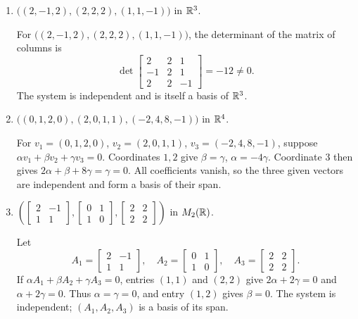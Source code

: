 \begin{enumerate}[label=\alph*)]
\item $\bigl((2,-1,2),(2,2,2),(1,1,-1)\bigr)$ in $\mathbb R^3$.

\begin{answer}
For $\bigl((2,-1,2),(2,2,2),(1,1,-1)\bigr)$, the determinant of the
matrix of columns is
\[
 \det\begin{bmatrix}2&2&1\\-1&2&1\\2&2&-1\end{bmatrix}=-12\ne0.
\]
The system is independent and is itself a basis of $\mathbb R^3$.
\end{answer}

\item $\bigl((0,1,2,0),(2,0,1,1),(-2,4,8,-1)\bigr)$ in $\mathbb R^4$.

\begin{answer}
For $v_1=(0,1,2,0)$, $v_2=(2,0,1,1)$, $v_3=(-2,4,8,-1)$,
suppose $\alpha v_1+\beta v_2+\gamma v_3=0$.
Coordinates $1,2$ give $\beta=\gamma$, $\alpha=-4\gamma$.
Coordinate $3$ then gives $2\alpha+\beta+8\gamma=\gamma=0$.
All coefficients vanish, so the three given vectors are independent
and form a basis of their span.
\end{answer}

\item $\left(\begin{bmatrix}2&-1\\1&1\end{bmatrix},\begin{bmatrix}0&1\\1&0\end{bmatrix},\begin{bmatrix}2&2\\2&2\end{bmatrix}\right)$ in $M_2(\mathbb R)$.

\begin{answer}
Let
\[
 A_1=\begin{bmatrix}2&-1\\1&1\end{bmatrix},\quad
 A_2=\begin{bmatrix}0&1\\1&0\end{bmatrix},\quad
 A_3=\begin{bmatrix}2&2\\2&2\end{bmatrix}.
\]
If $\alpha A_1+\beta A_2+\gamma A_3=0$, entries $(1,1)$ and $(2,2)$ give
$2\alpha+2\gamma=0$ and $\alpha+2\gamma=0$.
Thus $\alpha=\gamma=0$, and entry $(1,2)$ gives $\beta=0$.
The system is independent; $(A_1,A_2,A_3)$ is a basis of its span.
\end{answer}


\end{enumerate}
